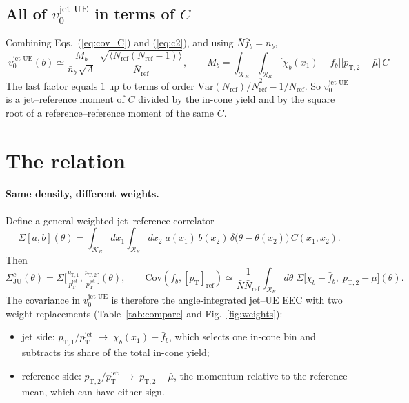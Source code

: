 \documentclass[11pt,a4paper]{article}
\newcommand{\pT}{p_\mathrm{T}}
\newcommand{\vjet}{v_0^{\mathrm{jet\text{-}UE}}}
\newcommand{\mpt}{[\pT]_\mathrm{ref}}
\newcommand{\K}{\mathcal{K}_R}
\newcommand{\Rr}{\mathcal{R}_R}
\newcommand{\Nref}{N_\mathrm{ref}}
\newcommand{\pjet}{p_\mathrm{T}^\mathrm{jet}}
\begin{document}
\subsection{All of $\vjet$ in terms of $C$}
Combining Eqs.~(\ref{eq:cov_C}) and (\ref{eq:c2}), and using $\bar N\bar f_b=\bar n_b$,
\begin{equation}
\boxed{\;\vjet(b)\simeq\frac{M_b}{\bar n_b\,\sqrt{\Lambda}}\;\frac{\sqrt{\langle\Nref(\Nref-1)\rangle}}{\bar N_\mathrm{ref}},\qquad
M_b=\int_{\K}\!\int_{\Rr}\big[\chi_b(x_1)-\bar f_b\big]\big[p_{\mathrm{T},2}-\bar\mu\big]\,C\;}
\label{eq:v0_C}
\end{equation}
The last factor equals $1$ up to terms of order $\mathrm{Var}(\Nref)/\bar N_\mathrm{ref}^2-1/\bar N_\mathrm{ref}$. So $\vjet$ is a jet--reference moment of $C$ divided by the in-cone yield and by the square root of a reference--reference moment of the same $C$.

\section{The relation}
\label{sec:relation}

\paragraph{Same density, different weights.}
Define a general weighted jet--reference correlator
\begin{equation}
\Sigma[a,b](\theta)=\int_{\K}\!dx_1\!\int_{\Rr}\!dx_2\;a(x_1)\,b(x_2)\,\delta\big(\theta-\theta(x_2)\big)\,C(x_1,x_2).
\end{equation}
Then
\begin{equation}
\Sigma^{c}_\mathrm{JU}(\theta)=\Sigma\Big[\tfrac{p_{\mathrm{T},1}}{\pjet},\tfrac{p_{\mathrm{T},2}}{\pjet}\Big](\theta),\qquad
\mathrm{Cov}(f_b,\mpt)\simeq\frac{1}{\bar N\bar N_\mathrm{ref}}\int_{\Rr}\!d\theta\;\Sigma\big[\chi_b-\bar f_b,\;p_{\mathrm{T},2}-\bar\mu\big](\theta).
\label{eq:relation}
\end{equation}
The covariance in $\vjet$ is therefore the angle-integrated jet--UE EEC with two weight replacements (Table~\ref{tab:compare} and Fig.~\ref{fig:weights}):
\begin{itemize}
\item jet side: $p_{\mathrm{T},1}/\pjet\;\to\;\chi_b(x_1)-\bar f_b$, which selects one in-cone bin and subtracts its share of the total in-cone yield;
\item reference side: $p_{\mathrm{T},2}/\pjet\;\to\;p_{\mathrm{T},2}-\bar\mu$, the momentum relative to the reference mean, which can have either sign.
\end{itemize}
\end{document}
